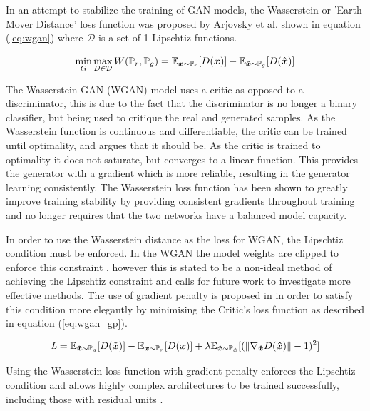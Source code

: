 In an attempt to stabilize the training of GAN models, the Wasserstein or 'Earth Mover Distance' loss function was proposed by Arjovsky et al. \cite{Arjovsky2017} shown in equation (\ref{eq:wgan}) where $\mathcal{D}$ is a set of 1-Lipschtiz functions.

\begin{equation} \label{eq:wgan}
    \min_{G} \max_{D \in \mathcal{D}} W(\mathbb{P}_{r}, \mathbb{P}_{g}) =
            \mathbb{E}_{{\boldsymbol{{x}}} \sim \mathbb{P}_{r}} [D({\boldsymbol{{x}}})]
            -\mathbb{E}_{{\boldsymbol{{\hat{x}}}} \sim \mathbb{P}_{g}} [D(\hat{{\boldsymbol{{x}}}})]
\end{equation}
\quad

The Wasserstein GAN (WGAN) model uses a critic as opposed to a discriminator, this is due to the fact that the discriminator is no longer a binary classifier, but being used to critique the real and generated samples. 
As the Wasserstein function is continuous and differentiable, the critic can be trained until optimality, and \cite{Arjovsky2017} argues that it should be.
As the critic is trained to optimality it does not saturate, but converges to a linear function.
This provides the generator with a gradient which is more reliable, resulting in the generator learning consistently.
The Wasserstein loss function has been shown to greatly improve training stability by providing consistent gradients throughout training and no longer requires that the two networks have a balanced model capacity.

In order to use the Wasserstein distance as the loss for WGAN, the Lipschtiz condition must be enforced.
In the WGAN the model weights are clipped to enforce this constraint \cite{Arjovsky2017}, however this is stated to be a non-ideal method of achieving the Lipschtiz constraint and calls for future work to investigate more effective methods.
The use of gradient penalty is proposed in \cite{Gulrajani2017} in order to satisfy this condition more elegantly by minimising the Critic's loss function as described in equation (\ref{eq:wgan_gp}).

\begin{equation} \label{eq:wgan_gp}
    \textit{L}
        = \mathbb{E}_{{\boldsymbol{{\tilde{x}}}} \sim \mathbb{P}_{g}} [D(\tilde{{{\boldsymbol{{x}}}}})]
        - \mathbb{E}_{{\boldsymbol{{x}}} \sim \mathbb{P}_{r}} [D({\boldsymbol{{x}}})]
        + \lambda \mathbb{E}_{{\boldsymbol{{\hat{x}}}} \sim \mathbb{P}_{{\boldsymbol{{\hat{x}}}}}} 
            [(\| \nabla_{{\boldsymbol{{\hat{x}}}}} D({\boldsymbol{{\hat{x}}}}) \| - 1)^2]
\end{equation}
\quad

Using the Wasserstein loss function with gradient penalty enforces the Lipschtiz condition and allows highly complex architectures to be trained successfully, including those with residual units \cite{Gulrajani2017}.

